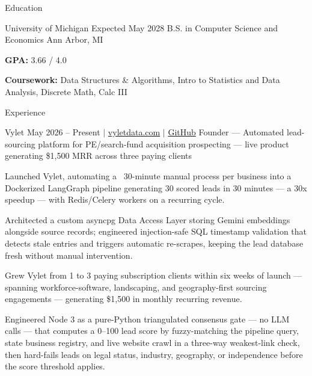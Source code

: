 \documentclass[
	11pt
]{../../template}
\begin{document}
	\begin{rSection}{E}{ducation}
		\begin{rSectionEntry}
			{University of Michigan}
			{Expected May 2028}
			{B.S. in Computer Science and Economics}
			{}
			{Ann Arbor, MI}

			\item \textbf{GPA:} 3.66 / 4.0
			\item \textbf{Coursework:} Data Structures \& Algorithms, Intro to Statistics and Data Analysis, Discrete Math, Calc III
		\end{rSectionEntry}
	\end{rSection}

	\begin{rSection}{E}{xperience}
		\begin{rSectionEntry}
			{Vylet}
			{May 2026 -- Present $\vert$ \href{https://vyletdata.com}{vyletdata.com} $\vert$ \href{https://github.com/Verdent06/Lead-Gen-Agentic-Pipeline}{GitHub}}
			{Founder --- Automated lead-sourcing platform for PE/search-fund acquisition prospecting --- live product generating \$1,500 MRR across three paying clients}
			{}
			{}

			\item Launched Vylet, automating a ~30-minute manual process per business into a Dockerized LangGraph pipeline generating 30 scored leads in 30 minutes --- a 30x speedup --- with Redis/Celery workers on a recurring cycle.
			\item Architected a custom asyncpg Data Access Layer storing Gemini embeddings alongside source records; engineered injection-safe SQL timestamp validation that detects stale entries and triggers automatic re-scrapes, keeping the lead database fresh without manual intervention.
			\item Grew Vylet from 1 to 3 paying subscription clients within six weeks of launch --- spanning workforce-software, landscaping, and geography-first sourcing engagements --- generating \$1,500 in monthly recurring revenue.
			\item Engineered Node 3 as a pure-Python triangulated consensus gate --- no LLM calls --- that computes a 0--100 lead score by fuzzy-matching the pipeline query, state business registry, and live website crawl in a three-way weakest-link check, then hard-fails leads on legal status, industry, geography, or independence before the score threshold applies.
		\end{rSectionEntry}


\end{rSection}
\end{document}

